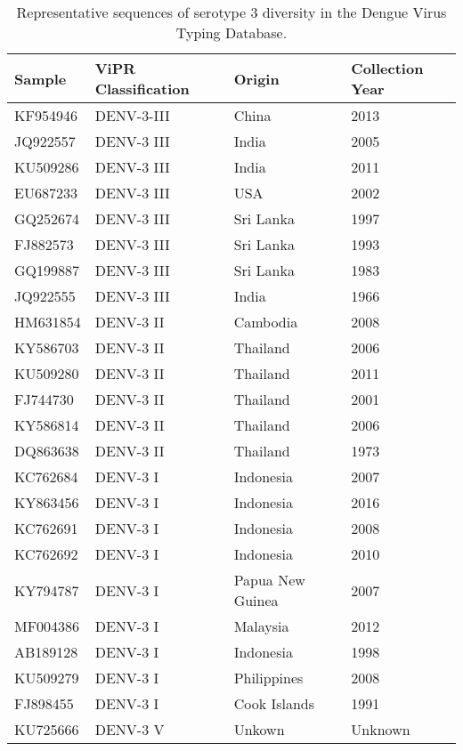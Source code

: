 \begin{longtable}{@{}llll@{}}
\caption{Representative sequences of serotype 3 diversity in the Dengue Virus Typing Database.}
\label{tab:chap4_s9}\\ \toprule
Sample   & ViPR Classification & Origin           & Collection Year \\ \midrule
KF954946 & DENV-3-III          & China            & 2013            \\
JQ922557 & DENV-3 III          & India            & 2005            \\
KU509286 & DENV-3 III          & India            & 2011            \\
EU687233 & DENV-3 III          & USA              & 2002            \\
GQ252674 & DENV-3 III          & Sri Lanka        & 1997            \\
FJ882573 & DENV-3 III          & Sri Lanka        & 1993            \\
GQ199887 & DENV-3 III          & Sri Lanka        & 1983            \\
JQ922555 & DENV-3 III          & India            & 1966            \\
HM631854 & DENV-3 II           & Cambodia         & 2008            \\
KY586703 & DENV-3 II           & Thailand         & 2006            \\
KU509280 & DENV-3 II           & Thailand         & 2011            \\
FJ744730 & DENV-3 II           & Thailand         & 2001            \\
KY586814 & DENV-3 II           & Thailand         & 2006            \\
DQ863638 & DENV-3 II           & Thailand         & 1973            \\
KC762684 & DENV-3 I            & Indonesia        & 2007            \\
KY863456 & DENV-3 I            & Indonesia        & 2016            \\
KC762691 & DENV-3 I            & Indonesia        & 2008            \\
KC762692 & DENV-3 I            & Indonesia        & 2010            \\
KY794787 & DENV-3 I            & Papua New Guinea & 2007            \\
MF004386 & DENV-3 I            & Malaysia         & 2012            \\
AB189128 & DENV-3 I            & Indonesia        & 1998            \\
KU509279 & DENV-3 I            & Philippines      & 2008            \\
FJ898455 & DENV-3 I            & Cook Islands     & 1991            \\
KU725666 & DENV-3 V            & Unkown           & Unknown        
\end{longtable}